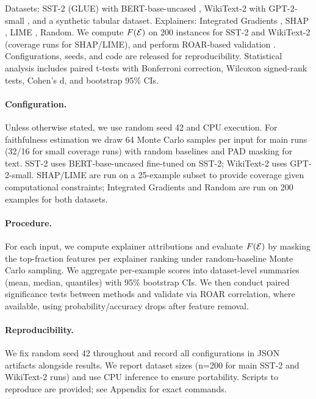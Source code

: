 Datasets: SST-2 (GLUE) \citep{wang2018glue} with BERT-base-uncased \citep{devlin2019bert}, WikiText-2 \citep{merity2016wikitext} with GPT-2-small \citep{radford2019gpt2}, and a synthetic tabular dataset. Explainers: Integrated Gradients \citep{sundararajan2017integrated}, SHAP \citep{lundberg2017shap}, LIME \citep{ribeiro2016lime}, Random. We compute $F(\mathcal{E})$ on 200 instances for SST-2 and WikiText-2 (coverage runs for SHAP/LIME), and perform ROAR-based validation \citep{hooker2019roar}. Configurations, seeds, and code are released for reproducibility. Statistical analysis includes paired t-tests with Bonferroni correction, Wilcoxon signed-rank tests, Cohen's d, and bootstrap 95\% CIs.

\paragraph{Configuration.} Unless otherwise stated, we use random seed 42 and CPU execution. For faithfulness estimation we draw 64 Monte Carlo samples per input for main runs (32/16 for small coverage runs) with random baselines and PAD masking for text. SST-2 uses BERT-base-uncased fine-tuned on SST-2; WikiText-2 uses GPT-2-small. SHAP/LIME are run on a 25-example subset to provide coverage given computational constraints; Integrated Gradients and Random are run on 200 examples for both datasets.

\paragraph{Procedure.} For each input, we compute explainer attributions and evaluate $F(\mathcal{E})$ by masking the top-fraction features per explainer ranking under random-baseline Monte Carlo sampling. We aggregate per-example scores into dataset-level summaries (mean, median, quantiles) with 95\% bootstrap CIs. We then conduct paired significance tests between methods and validate via ROAR correlation, where available, using probability/accuracy drops after feature removal.

\paragraph{Reproducibility.} We fix random seed 42 throughout and record all configurations in JSON artifacts alongside results. We report dataset sizes (n=200 for main SST-2 and WikiText-2 runs) and use CPU inference to ensure portability. Scripts to reproduce are provided; see Appendix for exact commands.

